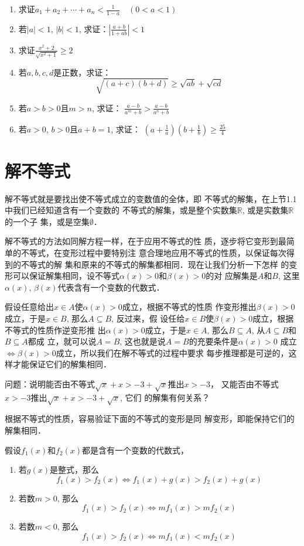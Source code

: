 \begin{enumerate}
\item 求证$a_1+a_2+\cdots+a_n<\frac{1}{1-a}\quad (0<a<1)$

\item 若$|a|<1$, $|b|<1$, 求证：$\left|\frac{a+b}{1+ab}\right|<1$

\item 求证$\frac{x^2+2}{\sqrt{x^2+1}}\ge 2$

\item 若$a,b,c,d$是正数，求证：
$$\sqrt{(a+c)(b+d)}\ge \sqrt{ab}+\sqrt{cd}$$
\item 若$a>b>0$且$m>n$, 求证：
$\frac{a-b}{a^m+b}>\frac{a-b}{a^n+b}$

\item 若$a>0$, $b>0$且$a+b=1$, 求证：
$\left(a+\frac{1}{a}\right)\left(b+\frac{1}{b}\right)\ge \frac{25}{4}$
\end{enumerate}

\section{解不等式}
解不等式就是要找出使不等式成立的变数值的全体，即
不等式的解集，在上节1.1中我们已经知道含有一个变数的
不等式的解集，或是整个实数集$\mathbb{R}$, 或是实数集$\mathbb{R}$的一个子
集，或是空集$\emptyset$．

解不等式的方法如同解方程一样，在于应用不等式的性
质，逐步将它变形到最简单的不等式，在变形过程中要特别注
意合理地应用不等式的性质，以保证每次得到的不等式的解
集和原来的不等式的解集都相同．现在让我们分析一下怎样
的变形可以保证解集相同，设不等式$\alpha(x)>0$和$\beta(x)>0$的对
应解集是$A$和$B$, 这里$\alpha(x)$, $\beta(x)$代表含有一个变数的代数式．

假设任意给出$x\in A$使$\alpha(x)>0$成立，根据不等式的性质
作变形推出$\beta(x)>0$成立，于是$x\in B$, 那么$A\subseteq B$, 反过来，假
设任给$x\in B$使$\beta(x)>0$成立，根据不等式的性质作逆变形推
出$\alpha(x)>0$成立，于是$x\in A$, 那么$B\subseteq A$, 从$A\subseteq B$和$B\subseteq A$都成
立，就可以说$A=B$, 这也就是说$A=B$的充要条件是$\alpha(x)>0$
成立$\Longleftrightarrow\beta(x)>0$成立，所以我们在解不等式的过程中要求
每步推理都是可逆的，这样才能保证它们的解集相同．

问题：说明能否由不等式$\sqrt{x}+x>-3+\sqrt{x}$推出$x>-3$，
又能否由不等式$x>-3$推出$\sqrt{x}+x>-3+\sqrt{x}$, 它们
的解集有何关系？

根据不等式的性质，容易验证下面的不等式的变形是同
解变形，即能保持它们的解集相同．

假设$f_1(x)$和$f_2(x)$都是含有一个变数的代数式，
\begin{enumerate}
    \item 若$g(x)$是整式，那么
    \[f_1(x)>f_2(x)\Longleftrightarrow f_1(x)+g(x)>f_2(x)+g(x)\]
    \item 若数$m>0$, 那么
    \[f_1(x)>f_2(x)\Longleftrightarrow mf_1(x)>mf_2(x)\]
    \item 若数$m<0$, 那么
    \[f_1(x)>f_2(x)\Longleftrightarrow mf_1(x)<mf_2(x)\]
\end{enumerate}


